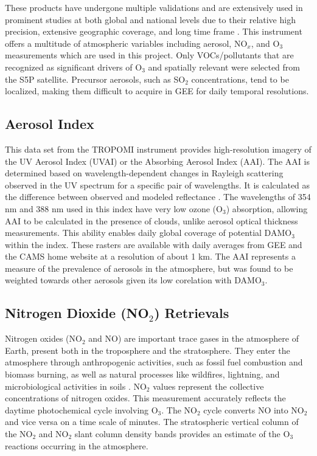 These products have undergone multiple validations and are extensively used in prominent studies at both global and national levels due to their relative high precision, extensive geographic coverage, and long time frame \parencite{zhang_ozone_2019}. This instrument offers a multitude of atmospheric variables including aerosol, NO$_x$, and O$_3$ measurements which are used in this project. Only VOCs/pollutants that are recognized as significant drivers of O$_3$ and spatially relevant were selected from the S5P satellite. Precursor aerosols, such as SO$_2$ concentrations, tend to be localized, making them difficult to acquire in GEE for daily temporal resolutions.
\subsection{Aerosol Index}  \label{tmas:aai} This data set from the TROPOMI instrument provides high-resolution imagery of the UV Aerosol Index (UVAI) or the Absorbing Aerosol Index (AAI). The AAI is determined based on wavelength-dependent changes in Rayleigh scattering observed in the UV spectrum for a specific pair of wavelengths. It is calculated as the difference between observed and modeled reflectance \parencite{degraaf2005}. The wavelengths of 354 nm and 388 nm used in this index have very low ozone (O$_3$) absorption, allowing AAI to be calculated in the presence of clouds, unlike aerosol optical thickness measurements. This ability enables daily global coverage of potential DAMO$_3$ within the index. These rasters are available with daily averages from GEE and the CAMS home website at a resolution of about 1 km. The AAI represents a measure of the prevalence of aerosols in the atmosphere, but was found to be weighted towards other aerosols given its low corelation with DAMO$_3$.
\subsection{Nitrogen Dioxide (NO$_2$) Retrievals} \label{tmas:no2} Nitrogen oxides (NO$_2$ and NO) are important trace gases in the atmosphere of Earth, present both in the troposphere and the stratosphere. They enter the atmosphere through anthropogenic activities, such as fossil fuel combustion and biomass burning, as well as natural processes like wildfires, lightning, and microbiological activities in soils \parencite{zhang_characteristics_2024}. NO$_2$ values represent the collective concentrations of nitrogen oxides. This measurement accurately reflects the daytime photochemical cycle involving O$_3$. The NO$_2$ cycle converts NO into NO$_2$ and vice versa on a time scale of minutes. The stratospheric vertical column of the NO$_2$ and NO$_2$ slant column density bands provides an estimate of the O$_3$ reactions occurring in the atmosphere.
